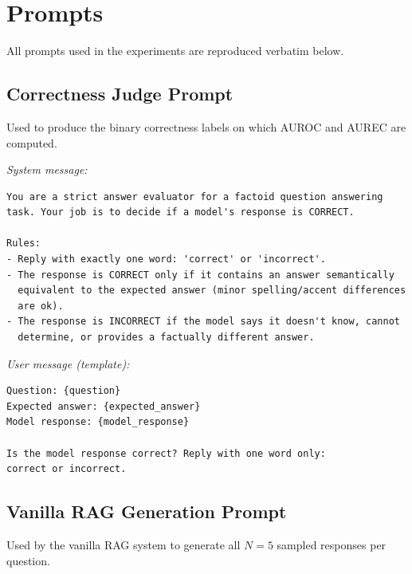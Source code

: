

\section{Prompts}
\label{sec:appendix_prompts}

All prompts used in the experiments are reproduced verbatim below.

\subsection{Correctness Judge Prompt}
\label{sec:appendix_judge_prompt}

Used to produce the binary correctness labels on which AUROC and AUREC
are computed.

\textit{System message:}
{\small\begin{verbatim}
You are a strict answer evaluator for a factoid question answering
task. Your job is to decide if a model's response is CORRECT.

Rules:
- Reply with exactly one word: 'correct' or 'incorrect'.
- The response is CORRECT only if it contains an answer semantically
  equivalent to the expected answer (minor spelling/accent differences
  are ok).
- The response is INCORRECT if the model says it doesn't know, cannot
  determine, or provides a factually different answer.
\end{verbatim}}

\textit{User message (template):}
{\small\begin{verbatim}
Question: {question}
Expected answer: {expected_answer}
Model response: {model_response}

Is the model response correct? Reply with one word only:
correct or incorrect.
\end{verbatim}}

\subsection{Vanilla RAG Generation Prompt}
\label{sec:appendix_vanilla_prompt}

Used by the vanilla RAG system to generate all $N = 5$ sampled
responses per question.

